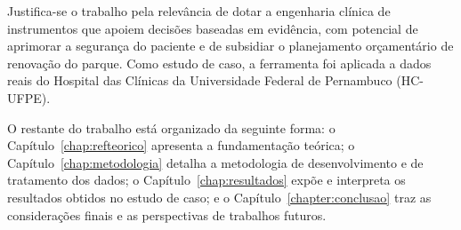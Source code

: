 Justifica-se o trabalho pela relevância de dotar a engenharia clínica de
instrumentos que apoiem decisões baseadas em evidência, com potencial de
aprimorar a segurança do paciente e de subsidiar o planejamento orçamentário de
renovação do parque. Como estudo de caso, a ferramenta foi aplicada a dados reais
do Hospital das Clínicas da Universidade Federal de Pernambuco (HC-UFPE).

O restante do trabalho está organizado da seguinte forma: o
Capítulo~\ref{chap:refteorico} apresenta a fundamentação teórica; o
Capítulo~\ref{chap:metodologia} detalha a metodologia de desenvolvimento e de
tratamento dos dados; o Capítulo~\ref{chap:resultados} expõe e interpreta os
resultados obtidos no estudo de caso; e o Capítulo~\ref{chapter:conclusao} traz
as considerações finais e as perspectivas de trabalhos futuros.
